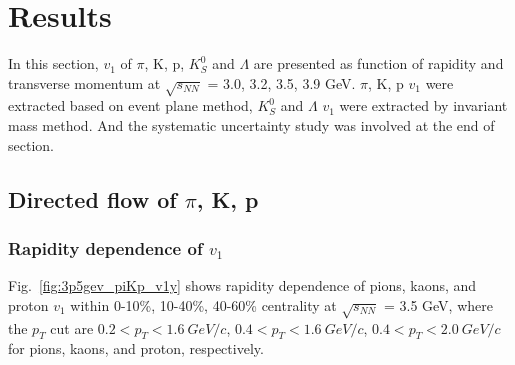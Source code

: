 \section{Results}

In this section, $v_1$ of $\pi$, K, p, $K^{0}_{S}$ and $\Lambda$ are presented as function of rapidity and transverse momentum at $\sqrt{s_{NN}}$ = 3.0, 3.2, 3.5, 3.9 GeV.
$\pi$, K, p $v_1$ were extracted based on event plane method, $K^{0}_{S}$ and $\Lambda$ $v_1$ were extracted by invariant mass method.
And the systematic uncertainty study was involved at the end of section.

\subsection{Directed flow of $\pi$, K, p}

\subsubsection{Rapidity dependence of $v_1$}

Fig.~\ref{fig:3p5gev_piKp_v1y} shows rapidity dependence of pions, kaons, and proton $v_1$ within 0-10\%, 10-40\%, 40-60\% centrality at $\sqrt{s_{NN}}$ = 3.5 GeV,
where the $p_T$ cut are $0.2 < p_T < 1.6~GeV/c$, $0.4 < p_T < 1.6~GeV/c$, $0.4 < p_T < 2.0~GeV/c$ for pions, kaons, and proton, respectively. 


